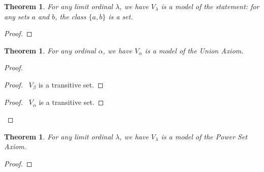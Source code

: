 \documentclass{book}
\let\qed\relax
\newtheorem{thm}[ax]{Theorem}
\theoremstyle{definition}
\begin{document}
\begin{thm}
\label{thm:modelPairing}
For any limit ordinal $\lambda$, we have $V_\lambda$ is a model of the statement: for any sets $a$ and $b$, the class $\{ a,b \}$ is a set.
\end{thm}

\begin{proof}
\pf
{}
\qed
\end{proof}

\begin{thm}
\label{thm:modelUnion}
For any ordinal $\alpha$, we have $V_\alpha$ is a model of the Union Axiom.
\end{thm}

\begin{proof}
\pf
{}
\begin{proof}
	\pf\ $V_\beta$ is a transitive set.
\end{proof}
\begin{proof}
	\pf\ $V_\alpha$ is a transitive set.
\end{proof}
\qed 
\end{proof}

\begin{thm}
\label{thm:modelPowerSet}
For any limit ordinal $\lambda$, we have $V_\lambda$ is a model of the Power Set Axiom.
\end{thm}

\begin{proof}
\pf
{}
\qed
\end{proof}
\end{document}

